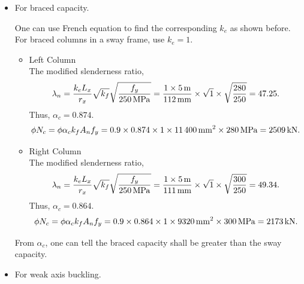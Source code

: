 \begin{solution}
\begin{itemize}
\begin{itemize}
Alternatively, $L_e=k_eL_x=\SI{6.60}{\m}$ could be used to get \SI{1961}{\kn} by linear interpolation from .
\end{itemize}
Thus the total $N^*=\sum{}N^*_i=\SI{2259}{\kn}+\SI{1961}{\kn}=\SI{4220}{\kn}$.
\item For braced capacity.

One can use French equation to find the corresponding $k_e$ as shown before.
For braced columns in a sway frame, use $k_e=1$.
\begin{itemize}
\item Left Column\\
The modified slenderness ratio,
\begin{gather*}
\lambda_n=\dfrac{k_eL_x}{r_x}\sqrt{k_f}\sqrt{\dfrac{f_y}{\SI{250}{\mega\pascal}}}=\dfrac{1\times\SI{5}{\meter}}{\SI{112}{\milli\meter}}\times\sqrt{1}\times\sqrt{\dfrac{280}{250}}=47.25.
\end{gather*}
Thus, $\alpha_c=0.874$.
\begin{gather*}
\phi{}N_c=\phi\alpha_ck_fA_nf_y=0.9\times0.874\times1\times\SI{11400}{\milli\meter^2}\times\SI{280}{\mega\pascal}=\SI{2509}{\kilo\newton}.
\end{gather*}
\item Right Column\\
The modified slenderness ratio,
\begin{gather*}
\lambda_n=\dfrac{k_eL_x}{r_x}\sqrt{k_f}\sqrt{\dfrac{f_y}{\SI{250}{\mega\pascal}}}=\dfrac{1\times\SI{5}{\meter}}{\SI{111}{\milli\meter}}\times\sqrt{1}\times\sqrt{\dfrac{300}{250}}=49.34.
\end{gather*}
Thus, $\alpha_c=0.864$.
\begin{gather*}
\phi{}N_c=\phi\alpha_ck_fA_nf_y=0.9\times0.864\times1\times\SI{9320}{\milli\meter^2}\times\SI{300}{\mega\pascal}=\SI{2173}{\kilo\newton}.
\end{gather*}
\end{itemize}
From $\alpha_c$, one can tell the braced capacity shall be greater than the sway capacity.
\item For weak axis buckling.


\end{itemize}
\end{solution}

